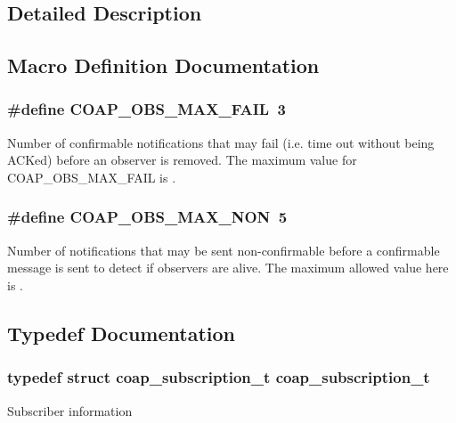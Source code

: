\subsection{Detailed Description}


\subsection{Macro Definition Documentation}
\hypertarget{group__observe_gac0e2f9142cbad18a6a1989177fd0f5cb}{}
\subsubsection[{C\+O\+A\+P\+\_\+\+O\+B\+S\+\_\+\+M\+A\+X\+\_\+\+F\+A\+I\+L}]{\setlength{\rightskip}{0pt plus 5cm}\#define C\+O\+A\+P\+\_\+\+O\+B\+S\+\_\+\+M\+A\+X\+\_\+\+F\+A\+I\+L~3}\label{group__observe_gac0e2f9142cbad18a6a1989177fd0f5cb}
Number of confirmable notifications that may fail (i.\+e. time out without being A\+C\+Ked) before an observer is removed. The maximum value for C\+O\+A\+P\+\_\+\+O\+B\+S\+\_\+\+M\+A\+X\+\_\+\+F\+A\+I\+L is {}. \hypertarget{group__observe_ga823232351cb2bd203d2b34555f0c1d37}{}
\subsubsection[{C\+O\+A\+P\+\_\+\+O\+B\+S\+\_\+\+M\+A\+X\+\_\+\+N\+O\+N}]{\setlength{\rightskip}{0pt plus 5cm}\#define C\+O\+A\+P\+\_\+\+O\+B\+S\+\_\+\+M\+A\+X\+\_\+\+N\+O\+N~5}\label{group__observe_ga823232351cb2bd203d2b34555f0c1d37}
Number of notifications that may be sent non-\/confirmable before a confirmable message is sent to detect if observers are alive. The maximum allowed value here is {}. 

\subsection{Typedef Documentation}
\hypertarget{group__observe_ga88f00cd2b5e1b336f1ab634eb01c8b42}{}
\subsubsection[{coap\+\_\+subscription\+\_\+t}]{\setlength{\rightskip}{0pt plus 5cm}typedef struct {\bf coap\+\_\+subscription\+\_\+t}  {\bf coap\+\_\+subscription\+\_\+t}}\label{group__observe_ga88f00cd2b5e1b336f1ab634eb01c8b42}
Subscriber information 